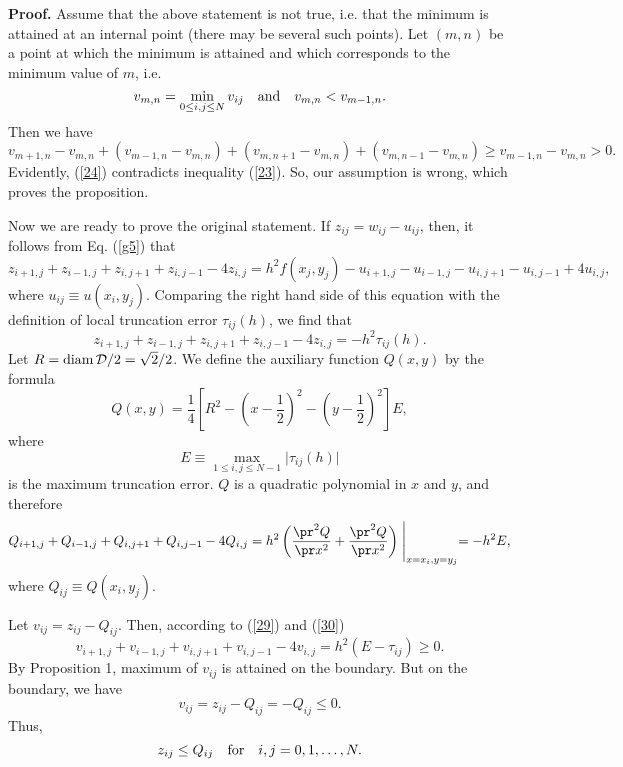     {\bf Proof.} Assume that the above
statement is not true, i.e. that the minimum is attained at an
internal point (there may be several such points). Let $(m,n)$ be
a point at which the minimum is attained and which corresponds to
the minimum value of $m$, i.e.
\[
v_{m,n}=\min_{0\leq i,j\leq N}v_{ij} \quad \hbox{and} \quad
v_{m,n}<v_{m-1,n}.
\]
Then we have
\begin{equation}
v_{m+1,n}-v_{m,n}+(v_{m-1,n}-v_{m,n})+(v_{m,n+1}-v_{m,n})
+(v_{m,n-1}-v_{m,n})\geq v_{m-1,n}-v_{m,n}>0. \label{24}
\end{equation}
Evidently, (\ref{24}) contradicts inequality (\ref{23}). So, our assumption is wrong, which proves
the proposition.

 
 
Now we are ready to prove the original statement. If $z_{ij}=w_{ij}-u_{ij}$, then, it follows from Eq. (\ref{g5}) that
\[
z_{i+1,j}+z_{i-1,j}+z_{i,j+1}+z_{i,j-1}-4z_{i,j}=h^{2}f(x_{j},y_{j})
-u_{i+1,j}-u_{i-1,j}-u_{i,j+1}-u_{i,j-1}+4u_{i,j},
\]
where $u_{ij}\equiv u(x_{i}, y_{j})$. Comparing the right hand side of this equation
with the definition of local truncation error $\tau_{ij}(h)$, we find that
\begin{equation}
z_{i+1,j}+z_{i-1,j}+z_{i,j+1}+z_{i,j-1}-4z_{i,j}=-h^{2}\tau_{ij}(h). \label{29}
\end{equation}
Let $R={\rm diam}\, {\cal D}/2=\sqrt{2}/2$. We define the auxiliary function $Q(x, y)$ by the formula
\[
Q(x, y)=\frac{1}{4}\left[R^{2}-\left(x-\frac{1}{2}\right)^{2}
-\left(y-\frac{1}{2}\right)^{2}\right]E,
\]
where
\[
E\equiv \max_{1\leq i,j\leq N-1}\vert\tau_{ij}(h)\vert
\]
is the maximum truncation error. $Q$ is a quadratic polynomial in $x$ and $y$, and therefore
\begin{equation}
Q_{i+1,j}+Q_{i-1,j}+Q_{i,j+1}+Q_{i,j-1}-4Q_{i,j}=
h^{2}\left(\frac{\pr^{2}Q}{\pr x^{2}}+\frac{\pr^{2}Q}{\pr x^{2}}\right)\Biggm\vert_{x=x_{i}, y=y_{j}}=
-h^{2}E, \label{30}
\end{equation}
where $Q_{ij}\equiv Q(x_{i}, y_{j})$.

 
 
Let $v_{ij}=z_{ij}-Q_{ij}$. Then, according to (\ref{29}) and (\ref{30})
\[
v_{i+1,j}+v_{i-1,j}+v_{i,j+1}+v_{i,j-1}-4v_{i,j}=h^{2}(E-\tau_{ij})\geq 0. \label{31}
\]
By Proposition 1, maximum of $v_{ij}$ is attained on the boundary. But on the boundary, we have
\[
v_{ij}=z_{ij}-Q_{ij}=-Q_{ij}\leq 0.
\]
Thus,
\[
z_{ij}\leq Q_{ij} \quad \hbox{for} \quad i,j=0,1,\dots, N.
\]


